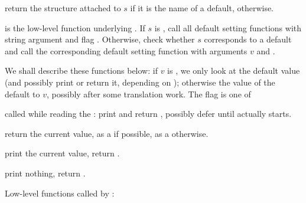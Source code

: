  return the 
structure attached to $s$ if it is the name of a default, 
otherwise.

 is the
low-level function underlying . If $s$ is , call all
default setting functions with string argument  and flag
. Otherwise, check whether $s$ corresponds to a default
and call the corresponding default setting function with arguments $v$ and
\fl.

We shall describe these functions below: if $v$ is , we only look
at the default value (and possibly print or return it, depending on
); otherwise the value of the default to $v$, possibly after some
translation work. The flag is one of

\item {} called while reading the : print and return
, possibly defer until  actually starts.

\item {} return the current value, as a  if possible, as
a  otherwise.

\item {} print the current value, return .

\item {} print nothing, return .

\noindent Low-level functions called by :













